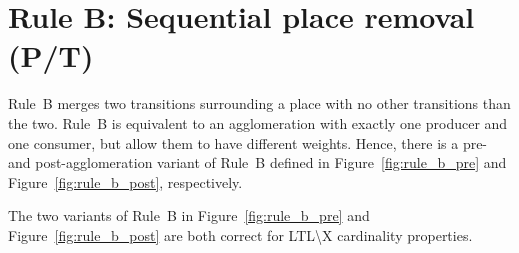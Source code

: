 \section*{Rule B: Sequential place removal (P/T)}\label{sec:rule_b}
Rule~B merges two transitions surrounding a place with no other transitions than the two.
Rule~B is equivalent to an agglomeration with exactly one producer and one consumer, but allow them to have different weights.
Hence, there is a pre- and post-agglomeration variant of Rule~B defined in Figure~\ref{fig:rule_b_pre} and Figure~\ref{fig:rule_b_post}, respectively.

\begin{theorem}\label{theorem:rule_b}
    The two variants of Rule~B in Figure~\ref{fig:rule_b_pre} and Figure~\ref{fig:rule_b_post} are both correct for LTL\textbackslash X cardinality properties.
\end{theorem}


